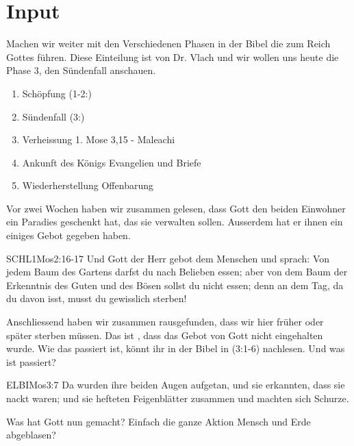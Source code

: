 \documentclass{../../inc/mybib}
\begin{document}
\section{ Input }
\begin{spacing}{1.5}    
    \begin{block}[Einleitung]
        Machen wir weiter mit den Verschiedenen Phasen in der Bibel die zum Reich Gottes führen. Diese Einteilung ist von Dr. Vlach und wir wollen uns heute die Phase 3, den Sündenfall anschauen.
    \end{block}

    \begin{enumerate}
    \item Schöpfung  (1-2:)
    \item Sündenfall  (3:)
    \item Verheissung 1. Mose 3,15 - Maleachi
    \item Ankunft des Königs Evangelien und Briefe
    \item Wiederherstellung Offenbarung
   \end{enumerate}        
    \begin{block}
       Vor zwei Wochen haben wir zusammen gelesen, dass Gott den beiden Einwohner ein Paradies geschenkt hat, das sie verwalten sollen. Ausserdem hat er ihnen ein einiges Gebot gegeben haben.
       \begin{bibelbox}{SCHL}{1Mos}{2:16-17}
            Und Gott der Herr gebot dem Menschen und sprach: \flqq Von jedem Baum des Gartens darfst du nach Belieben essen; aber von dem Baum der Erkenntnis des Guten und des Bösen sollst du nicht essen; denn an dem Tag, da du davon isst, musst du gewisslich sterben!\frqq
        \end{bibelbox}
        Anschliessend haben wir zusammen rausgefunden, dass wir  hier früher oder später sterben müssen.
        Das ist , dass das Gebot von Gott nicht eingehalten wurde. Wie das passiert ist, könnt ihr in der Bibel in  (3:1-6) nachlesen. Und was ist passiert?
        \begin{bibelbox}{ELB}{IMos}{3:7}
            Da wurden ihre beiden Augen aufgetan, und sie erkannten, dass sie nackt waren; und sie hefteten Feigenblätter zusammen und machten sich Schurze.
        \end{bibelbox}
        Was hat Gott nun gemacht? Einfach die ganze Aktion Mensch und Erde abgeblasen?
       

\end{block}
\end{spacing}
\end{document}
